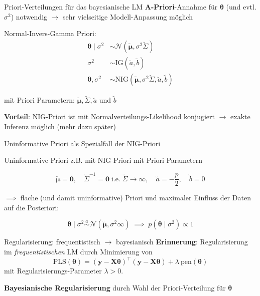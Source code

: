 \documentclass[
  ignorenonframetext,
  aspectratio=169,
]{beamer}
\newcommand{\bnull}{\bm{0}}
\newcommand{\by}{\bm{y}}
\newcommand{\bX}{\bm{X}}
\newcommand{\Ncal}{\mathcal{N}}
\newcommand{\ssd}{\sigma^2}
\newcommand{\btheta}{\bm{\theta}}
\newcommand{\mupri}{\breve{\bm{\mu}}}
\newcommand{\Sdpri}{\breve{\Sigma}}
\newcommand{\Sdipri}{\breve{\Sigma}^{-1}}
\newcommand{\apri}{\breve{a}}
\newcommand{\bpri}{\breve{b}}
\newcommand{\IG}{\text{IG}}
\begin{document}
\begin{frame}{Priori-Verteilungen für das bayesianische LM}
\protect{}\label{priori-verteilungen-fuxfcr-das-bayesianische-lm}
\textbf{A-Priori}-Annahme für \(\btheta\) (und evtl. \(\ssd\)) notwendig
\(\to\) sehr vielseitige Modell-Anpassung möglich

\begin{block}{Normal-Invers-Gamma Priori:}
\protect{}\label{normal-invers-gamma-priori}
\[
\begin{aligned}
  \btheta \mid \ssd &\sim  \Ncal(\mupri, \ssd \Sdpri) \\
  \ssd &\sim \IG(\apri, \bpri) \\
  \btheta, \ssd &\sim \text{NIG}(\mupri, \ssd \Sdpri, \apri, \bpri)
\end{aligned}
\]

mit Priori Parametern: \(\mupri, \Sdpri, \apri\) und \(\bpri\)
\end{block}

\textbf{Vorteil}: NIG-Priori ist mit Normalverteilungs-Likelihood
konjugiert \(\to\) exakte Inferenz möglich (mehr dazu später)
\end{frame}

\begin{frame}{Uninformative Priori als Spezialfall der NIG-Priori}
\protect{}\label{uninformative-priori-als-spezialfall-der-nig-priori}
\begin{block}{Uninformative Priori}
\protect{}\label{uninformative-priori}
z.B. mit NIG-Priori mit Priori Parametern

\[
\mupri = \bnull, \quad \Sdipri = \bnull \; \text{i.e.}\; \Sdpri \to \infty, \quad \apri = - \frac{p}{2}, \quad \bpri = 0
\]

\(\implies\) flache (und damit uninformative) Priori und maximaler
Einfluss der Daten auf die Posteriori:

\[
\btheta \mid \ssd \overset{a}{\sim}  \Ncal(\mupri, \ssd \infty) \; \implies \; p(\btheta\mid \ssd) \propto 1
\]
\end{block}
\end{frame}

\begin{frame}{Regularisierung: frequentistisch \(\to\) bayesianisch}
\protect{}\label{regularisierung-frequentistisch-to-bayesianisch}
\textbf{Erinnerung}: Regularisierung im \emph{frequentistischen} LM
durch Minimierung von
\[\text{PLS}(\btheta) = (\by - \bX \btheta)^\top (\by - \bX \btheta) + \lambda \ \text{pen}(\btheta)\]
mit Regularisierungs-Parameter \(\lambda > 0\). \vspace{0.5cm}

\textbf{Bayesianische Regularisierung} durch Wahl der Priori-Verteilung
für \(\btheta\)
\end{frame}
\end{document}
